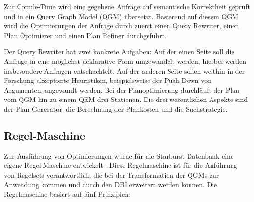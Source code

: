 Zur Comile-Time wird eine gegebene Anfrage auf semantische Korrektheit geprüft und in ein Query Graph Model (QGM) übersetzt. Basierend auf diesem QGM wird die Optimierungen der Anfrage durch zuerst einen Query Rewriter, einen Plan Optimierer und einen Plan Refiner durchgeführt.

Der Query Rewriter hat zwei konkrete Aufgaben: Auf der einen Seite soll die Anfrage in eine möglichst deklarative Form umgewandelt werden, hierbei werden insbesondere Anfragen entschachtelt. Auf der anderen Seite sollen weithin in der Forschung akzeptierte Heuristiken, beispielsweise der Push-Down von Argumenten, angewandt werden.
Bei der Planoptimierung durchläuft der Plan vom QGM hin zu einem QEM drei Stationen. Die drei wesentlichen Aspekte sind der Plan Generator, die Berechnung der Plankosten und die Suchstrategie. 

\subsection{Regel-Maschine}

Zur Ausführung von Optimierungen wurde für die Starburst Datenbank eine eigene Regel-Maschine entwickelt \cite{lohman1988Starbust}. Diese Regelmaschine ist für die Anführung von Regelsets verantwortlich, die bei der Transformation der QGMs zur Anwendung kommen und durch den DBI  erweitert werden können. Die Regelmaschine basiert auf fünf Prinzipien:

